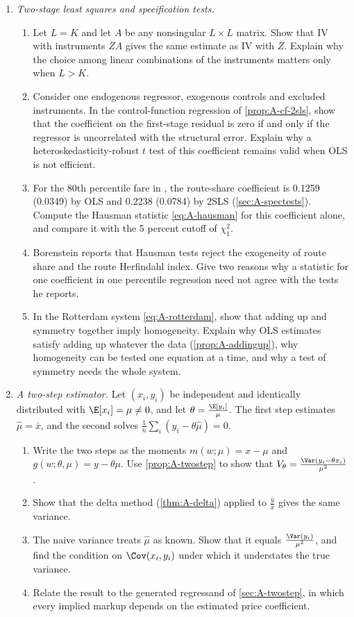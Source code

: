 \begin{enumerate}[label=\arabic*., leftmargin=*, itemsep=6pt]
\item \textit{Two-stage least squares and specification tests.}
\begin{enumerate}[label=(\alph*)]
  \item Let $L = K$ and let $A$ be any nonsingular $L \times L$ matrix. Show that IV with instruments $ZA$ gives the
  same estimate as IV with $Z$. Explain why the choice among linear combinations of the instruments matters only when
  $L > K$.
  \item Consider one endogenous regressor, exogenous controls and excluded instruments. In the control-function
  regression of \cref{prop:A-cf-2sls}, show that the coefficient on the first-stage residual is zero if and only if the
  regressor is uncorrelated with the structural error. Explain why a heteroskedasticity-robust $t$ test of this
  coefficient remains valid when OLS is not efficient.
  \item For the 80th percentile fare in \citet{Borenstein1989}, the route-share coefficient is 0.1259 (0.0349) by OLS
  and 0.2238 (0.0784) by 2SLS (\cref{sec:A-spectests}). Compute the Hausman statistic \eqref{eq:A-hausman} for this
  coefficient alone, and compare it with the 5 percent cutoff of $\chi^2_1$.
  \item Borenstein reports that Hausman tests reject the exogeneity of route share and the route Herfindahl index. Give two
  reasons why a statistic for one coefficient in one percentile regression need not agree with the tests he reports.
  \item In the Rotterdam system \eqref{eq:A-rotterdam}, show that adding up and symmetry together imply homogeneity.
  Explain why OLS estimates satisfy adding up whatever the data (\cref{prop:A-addingup}), why homogeneity can be
  tested one equation at a time, and why a test of symmetry needs the whole system.
\end{enumerate}

\item \textit{A two-step estimator.} Let $(x_i, y_i)$ be independent and identically distributed with
$\E[x_i] = \mu \neq 0$, and let $\theta = \frac{\E[y_i]}{\mu}$. The first step estimates $\hat\mu = \bar x$, and the
second solves $\frac{1}{n}\sum_i(y_i - \theta\hat\mu) = 0$.
\begin{enumerate}[label=(\alph*)]
  \item Write the two steps as the moments $m(w;\mu) = x - \mu$ and $g(w;\theta, \mu) = y - \theta\mu$. Use
  \cref{prop:A-twostep} to show that $V_\theta = \frac{\Var(y_i - \theta x_i)}{\mu^2}$.
  \item Show that the delta method (\cref{thm:A-delta}) applied to $\frac{\bar y}{\bar x}$ gives the same variance.
  \item The naive variance treats $\hat\mu$ as known. Show that it equals $\frac{\Var(y_i)}{\mu^2}$, and find the
  condition on $\Cov(x_i, y_i)$ under which it understates the true variance.
  \item Relate the result to the generated regressand of \cref{sec:A-twostep}, in which every implied markup depends on
  the estimated price coefficient.
\end{enumerate}


\end{enumerate}
